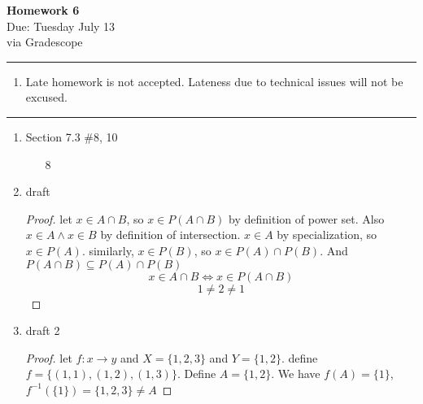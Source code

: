\documentclass[12pt]{article}
\newcommand{\paren}[1]{\left( #1 \right)}
\newif\ifshow
\begin{document}
\begin{center}
\ifshow
  \textbf{\Large Homework 2 Solution}\\
\else
  \textbf{\Large Homework 6}\\
\fi
Due: Tuesday July 13\\via Gradescope\\
\end{center}

\hrule

\vspace{0.2cm}

\begin{enumerate}[$\bullet$]  
\item Late homework is not accepted.  Lateness due to technical issues will not be excused.  
\end{enumerate}

\hrule

\vspace{0.5cm}



\begin{enumerate}

\item Section 7.3 \#8, 10
    \begin{enumerate}
        \item[8]
    \end{enumerate}


\item draft
    \begin{proof}
        let $x \in A \cap B$, so $x \in P(A \cap B)$ by definition of power set. Also $x \in A \wedge x \in B$ by definition of intersection. $x \in A$ by specialization, so $x \in P(A)$. similarly, $x \in P(B)$, so $x \in P(A) \cap P(B)$. And $P(A \cap B) \subseteq P(A)\cap P(B)$
        \[
        x \in A\cap B \iff x \in P(A \cap B)
        \]
        \[
        1 \neq 2 \neq 1
        \]
    \end{proof}
\item draft 2
    \begin{proof}
        let $f \colon x \to y$ and $X = \{1,2,3\}$ and $Y = \{1,2\}$. define $f = \{(1,1),(1,2),(1,3)\}$. Define $A = \{1,2\}$. We have $f(A) = \{1\}$, $f^{-1}\paren{\{1\}} = \{1,2,3\} \neq A$
    \end{proof}


\end{enumerate}
\end{document}
